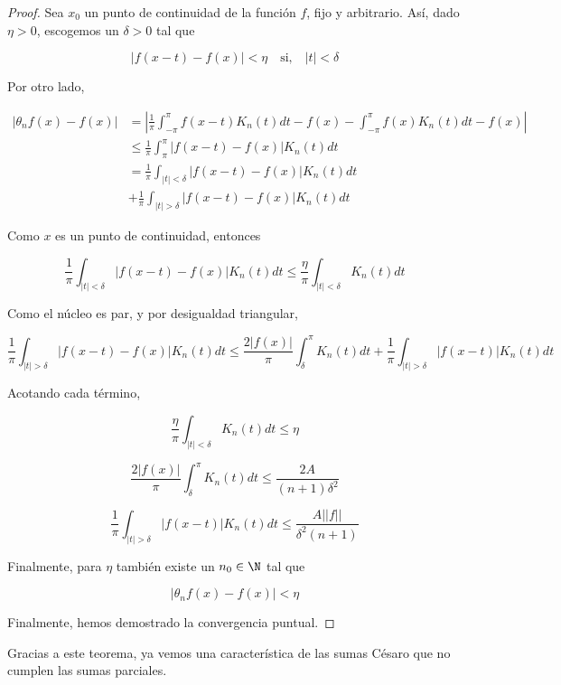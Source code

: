 \begin{proof}
    Sea $x_0$ un punto de continuidad de la función $f$, fijo y arbitrario. Así, dado $\eta > 0$, escogemos un $\delta > 0$ tal que

    \[
        |f(x-t) - f(x)| < \eta \quad \text{si,} \quad |t| < \delta
    \]

    Por otro lado,

    \begin{equation*}
        \begin{aligned}
            |\theta_n f(x) - f(x)| &= \left| \frac{1}{\pi} \int_{-\pi}^{\pi} f(x-t) K_n(t)dt - f(x) - \int_{-\pi}^{\pi} f(x) K_n(t)dt - f(x) \right| \\
            &\leq \frac{1}{\pi} \int_{\pi}^{\pi} |f(x-t) - f(x)| K_n(t) dt \\
            &= \frac{1}{\pi} \int_{|t|<\delta} |f(x-t) - f(x)| K_n(t) dt \\
            &+ \frac{1}{\pi} \int_{|t|>\delta} |f(x-t) - f(x)| K_n(t) dt
        \end{aligned}
    \end{equation*}

    Como $x$ es un punto de continuidad, entonces

    \[
        \frac{1}{\pi} \int_{|t|<\delta} |f(x-t) - f(x)| K_n(t) dt \leq \frac{\eta}{\pi} \int_{|t|<\delta} K_n(t)dt
    \]

    Como el núcleo es par, y por desigualdad triangular,

    \[
        \frac{1}{\pi} \int_{|t|>\delta} |f(x-t) - f(x)| K_n(t) dt \leq \frac{2|f(x)|}{\pi} \int_{\delta}^{\pi} K_n(t)dt + \frac{1}{\pi} \int_{|t|>\delta} |f(x-t)| K_n(t) dt
    \]

    Acotando cada término,

    \[
        \frac{\eta}{\pi} \int_{|t|<\delta} K_n(t)dt \leq \eta
    \]

    \[
        \frac{2|f(x)|}{\pi} \int_{\delta}^{\pi} K_n(t)dt \leq \frac{2A}{(n+1)\delta^2}
    \]

    \[
        \frac{1}{\pi} \int_{|t|>\delta} |f(x-t)| K_n(t) dt \leq \frac{A||f||}{\delta^2(n+1)}
    \]

    Finalmente, para $\eta$ también existe un $n_0 \in \N$ tal que

    \[
        |\theta_n f(x) - f(x)| < \eta
    \]

    Finalmente, hemos demostrado la convergencia puntual.
\end{proof}

Gracias a este teorema, ya vemos una característica de las sumas Césaro que no cumplen las sumas parciales.